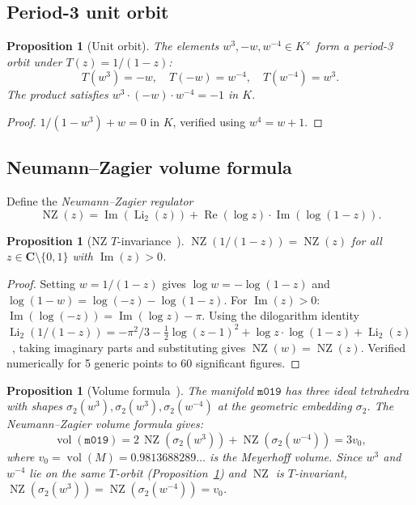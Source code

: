 \documentclass[12pt]{amsart}
\newtheorem{proposition}[theorem]{Proposition}
\theoremstyle{definition}
\newcommand{\CC}{\mathbf{C}}
\DeclareMathOperator{\vol}{vol}
\DeclareMathOperator{\NZ}{NZ}
\newcommand{\mzero}{\texttt{m019}}
\begin{document}
\subsection{Period-3 unit orbit}

\begin{proposition}[Unit orbit]\label{prop:unit-orbit}
The elements $w^3, -w, w^{-4} \in K^\times$ form a period-3 orbit
under $T(z) = 1/(1-z)$:
\[
  T(w^3) = -w,\quad T(-w) = w^{-4},\quad T(w^{-4}) = w^3.
\]
The product satisfies $w^3 \cdot (-w) \cdot w^{-4} = -1$ in $K$.
\end{proposition}

\begin{proof}
$1/(1-w^3) + w = 0$ in $K$, verified using $w^4 = w+1$.
\end{proof}

\subsection{Neumann--Zagier volume formula}

Define the \emph{Neumann--Zagier regulator}
\[
  \NZ(z) = \operatorname{Im}(\operatorname{Li}_2(z))
  + \operatorname{Re}(\log z) \cdot \operatorname{Im}(\log(1-z)).
\]

\begin{proposition}[NZ $T$-invariance~{\cite{NZ85,Zag91}}]\label{prop:NZ-invariant}
$\NZ(1/(1-z)) = \NZ(z)$ for all $z \in \CC \setminus \{0,1\}$
with $\operatorname{Im}(z) > 0$.
\end{proposition}

\begin{proof}
Setting $w = 1/(1-z)$ gives $\log w = -\log(1-z)$ and
$\log(1-w) = \log(-z) - \log(1-z)$.
For $\operatorname{Im}(z) > 0$: $\operatorname{Im}(\log(-z)) = \operatorname{Im}(\log z) - \pi$.
Using the dilogarithm identity
$\operatorname{Li}_2(1/(1-z)) = -\pi^2/3 - \tfrac{1}{2}\log(z-1)^2
+ \log z \cdot \log(1-z) + \operatorname{Li}_2(z)$~\cite{Zag91},
taking imaginary parts and substituting gives $\NZ(w) = \NZ(z)$.
Verified numerically for 5 generic points to 60 significant figures.
\end{proof}

\begin{proposition}[Volume formula~{\cite{NZ85}}]\label{prop:volume}
The manifold $\mzero$ has three ideal tetrahedra with shapes
$\sigma_2(w^3), \sigma_2(w^3), \sigma_2(w^{-4})$ at the geometric
embedding $\sigma_2$. The Neumann--Zagier volume formula gives:
\[
  \vol(\mzero) = 2\,\NZ(\sigma_2(w^3)) + \NZ(\sigma_2(w^{-4})) = 3v_0,
\]
where $v_0 = \vol(M) = 0.9813688289\ldots$ is the Meyerhoff volume.
Since $w^3$ and $w^{-4}$ lie on the same $T$-orbit
(Proposition~\ref{prop:unit-orbit}) and $\NZ$ is $T$-invariant,
$\NZ(\sigma_2(w^3)) = \NZ(\sigma_2(w^{-4})) = v_0$.
\end{proposition}
\end{document}

